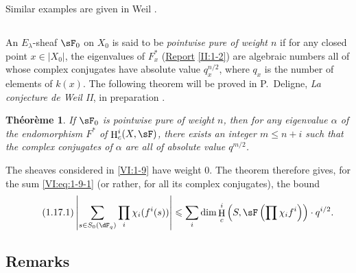 \documentclass[oneside]{book}
\DeclareMathOperator{\h}{H}
\theoremstyle{sga-source}
\theoremstyle{sga-source-dash}
\theoremstyle{sga-source-dotdash}
\theoremstyle{sga-source-number-note-dash}
\theoremstyle{sga-source-note-number-dotdash}
\theoremstyle{sga-source-example-dotdash}
\theoremstyle{sga-source-inline-number}
\theoremstyle{sga-source-bare-number}
\theoremstyle{sga-source}
\newtheorem{theorem_}[subsection]{Théorème}
\newcommand{\PrintPage}[1]{}\newcommand{\MathPage}[1]{}\newcommand{\PrintCite}[2]{#1}\newcommand{\var}[3]{#2}
\begin{document}
Similar examples are given in Weil \cite[App V, 3rd ed.]{we74}. 





\subsection{}\label{VI:1-16}

An $E_\lambda$-sheaf $\sF_0$ on $X_0$ is said to be \emph{pointwise pure of 
weight $n$} if for any closed point $x\in |X_0|$, the eigenvalues of 
$F_x^\ast$ (\hyperref[II]{Report} \ref{II:1-2}) are algebraic numbers 
all of whose complex conjugates have absolute value 
$q_x^{n/2}$, where $q_x$ is the number of elements of $k(x)$. The 
following theorem will be proved in P.~Deligne, \emph{La conjecture de Weil II}, in preparation \cite{de80}. 





\PrintPage{178}
\begin{theorem_}\label{VI:1-17}
If $\sF_0$ is pointwise pure of weight $n$, then for any eigenvalue $\alpha$ 
of the endomorphism $F^\ast$ of $\h_c^i(X,\sF)$, there exists an integer 
$m\leqslant n+i$ such that the complex conjugates of $\alpha$ are all of 
absolute value $q^{m/2}$.
\end{theorem_}

The sheaves considered in \ref{VI:1-9} have weight $0$. The theorem 
therefore gives, for the sum \ref{VI:eq:1-9-1} (or rather, for all its 
complex conjugates), the bound 
\begin{equation*}\tag{1.17.1}\label{VI:eq:1-17-1}
  \left|\sum_{s\in S_0(\dF_q)} \prod_i \chi_i(f^i(s)) \right| \leqslant \sum_i \dim \h_c^i\left(S,\sF\left(\prod \chi_i f^i\right)\right)\cdot q^{i/2} \text{.}
\end{equation*}





\subsection{Remarks}\label{VI:1-18}
\end{document}
